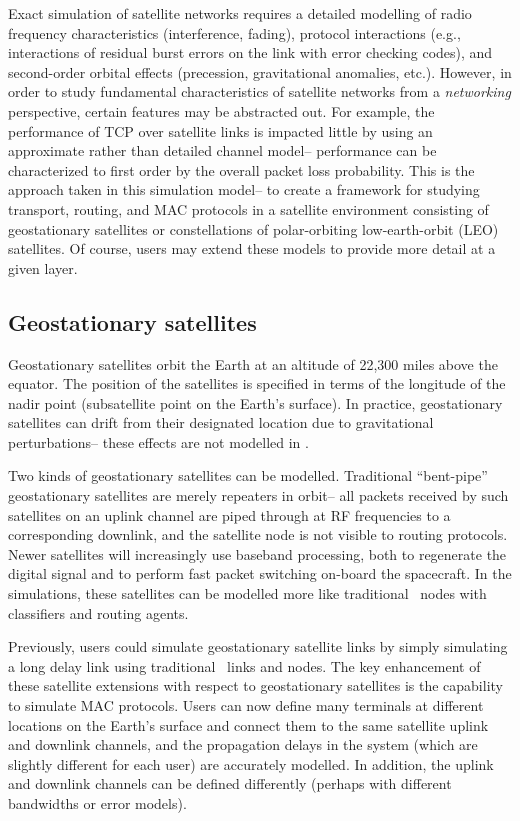 Exact simulation of satellite networks requires a
detailed modelling of radio frequency characteristics (interference, fading),
protocol interactions (e.g., interactions of residual burst errors on the 
link with error checking codes), and second-order orbital effects (precession,
gravitational anomalies, etc.).  However, in order to study fundamental
characteristics of satellite networks from a {\em networking} perspective,
certain features may be abstracted out.  For example, the performance of
TCP over satellite links is impacted little by using an approximate rather than 
detailed channel model-- performance can be characterized to first order
by the overall packet loss probability.  This is the approach taken in this
simulation model-- to create a framework for studying transport, 
routing, and MAC protocols in a satellite environment consisting of
geostationary satellites or constellations of polar-orbiting 
low-earth-orbit (LEO) satellites.  Of course, users may extend these models
to provide more detail at a given layer.   


\subsection{Geostationary satellites}
\label{sec:satellite/overview/geo}

Geostationary satellites orbit the Earth at an altitude of 22,300 miles 
above the equator.  The position of the satellites is specified in terms
of the longitude of the nadir point (subsatellite point on the Earth's
surface).  In practice, geostationary satellites can drift from their
designated location due to gravitational perturbations-- these effects
are not modelled in \ns.   

Two kinds of geostationary satellites can be modelled.  Traditional
``bent-pipe'' geostationary satellites are merely repeaters in orbit--
all packets received by such satellites on an uplink channel are piped
through at RF frequencies to a corresponding downlink, and the satellite node
is not visible to routing protocols.   Newer satellites will
increasingly use baseband processing, both to regenerate the digital signal and
to perform fast packet switching on-board
the spacecraft.  In the simulations, these satellites can be modelled more like 
traditional \ns~nodes with classifiers and routing agents.  
  
Previously, users could simulate geostationary satellite links by simply
simulating a long delay link using traditional \ns~links and nodes.  The
key enhancement of these satellite extensions with respect to geostationary
satellites is the capability to simulate MAC protocols.  Users can now
define many terminals at different locations on the Earth's surface and
connect them to the same satellite uplink and downlink channels, and the
propagation delays in the system (which are slightly different for each
user) are accurately modelled.  In addition, the uplink and downlink channels
can be defined differently (perhaps with different bandwidths or error models).

